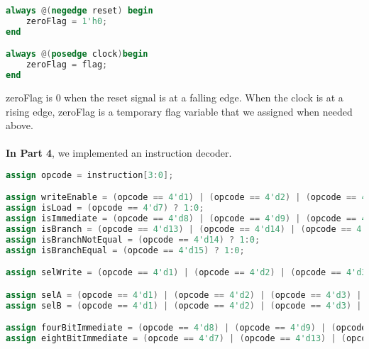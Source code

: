 \documentclass[pdftex,12pt,a4paper]{article}
\begin{document}
\begin{lstlisting}[language=Verilog, caption=zeroFlag]
always @(negedge reset) begin
    zeroFlag = 1'h0;
end

always @(posedge clock)begin
    zeroFlag = flag;
end
\end{lstlisting}

zeroFlag is 0 when the reset signal is at a falling edge. When the clock is at a rising edge, zeroFlag is a temporary flag variable that we assigned when needed above.\\
\\

\textbf{In Part 4}, we implemented an instruction decoder.
\begin{lstlisting}[language=Verilog, caption=Instruction decoder]
assign opcode = instruction[3:0];

assign writeEnable = (opcode == 4'd1) | (opcode == 4'd2) | (opcode == 4'd3) | (opcode == 4'd4) | (opcode == 4'd5) | (opcode == 4'd6) | (opcode == 4'd7) | (opcode == 4'd8) | (opcode == 4'd9) | (opcode == 4'd10) | (opcode == 4'd11) ? 1:0;
assign isLoad = (opcode == 4'd7) ? 1:0;
assign isImmediate = (opcode == 4'd8) | (opcode == 4'd9) | (opcode == 4'd10) ? 1:0;
assign isBranch = (opcode == 4'd13) | (opcode == 4'd14) | (opcode == 4'd15) ? 1:0;
assign isBranchNotEqual = (opcode == 4'd14) ? 1:0; 
assign isBranchEqual = (opcode == 4'd15) ? 1:0; 

assign selWrite = (opcode == 4'd1) | (opcode == 4'd2) | (opcode == 4'd3) | (opcode == 4'd4) | (opcode == 4'd5) | (opcode == 4'd6) | (opcode == 4'd7) | (opcode == 4'd8) | (opcode == 4'd9) | (opcode == 4'd10) | (opcode == 4'd11) ? instruction[7:4]: 4'bZ;

assign selA = (opcode == 4'd1) | (opcode == 4'd2) | (opcode == 4'd3) | (opcode == 4'd4) | (opcode == 4'd5) | (opcode == 4'd6) | (opcode == 4'd8) | (opcode == 4'd9) | (opcode == 4'd10) | (opcode == 4'd11) ? instruction[11:8] : 4'bZ;
assign selB = (opcode == 4'd1) | (opcode == 4'd2) | (opcode == 4'd3) | (opcode == 4'd4) | (opcode == 4'd5) | (opcode == 4'd6) | (opcode == 4'd11)? instruction[15:12] : 4'bZ;

assign fourBitImmediate = (opcode == 4'd8) | (opcode == 4'd9) | (opcode == 4'd10) ? {12'd0,instruction[15:12]}:16'bZ;
assign eightBitImmediate = (opcode == 4'd7) | (opcode == 4'd13) | (opcode == 4'd14) | (opcode == 4'd15) ?{8'd0, instruction[15:8]}:16'bZ;

\end{lstlisting}
\end{document}
